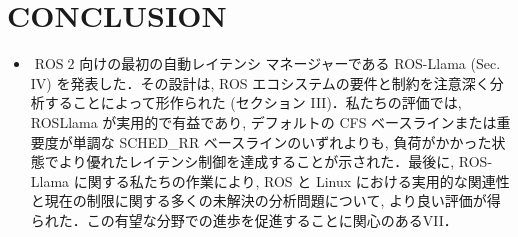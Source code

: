 
\section{CONCLUSION}
\label{sec: conclusion}

\begin{frame}{}
    \begin{itemize}
        \item  $\operatorname{ROS} 2$ 向けの最初の自動レイテンシ マネージャーである ROS-Llama (Sec. IV) を発表した．その設計は, ROS エコシステムの要件と制約を注意深く分析することによって形作られた (セクション III)．私たちの評価では, ROSLlama が実用的で有益であり, デフォルトの CFS ベースラインまたは重要度が単調な SCHED\_RR ベースラインのいずれよりも, 負荷がかかった状態でより優れたレイテンシ制御を達成することが示された．最後に, ROS-Llama に関する私たちの作業により, ROS と Linux における実用的な関連性と現在の制限に関する多くの未解決の分析問題について, より良い評価が得られた．この有望な分野での進歩を促進することに関心のあるVII．
    \end{itemize}
\end{frame}
